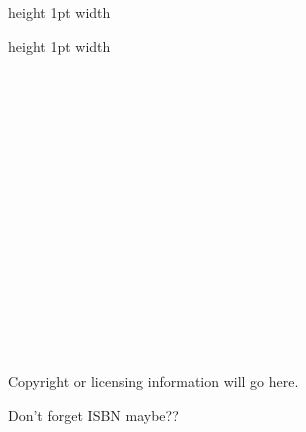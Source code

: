 \maketitle

\newpage
~
\newpage

~\\~\\~\\~\\~\\~\\~\\~\\~\\

\begin{center}
\begin{Large}
	\noindent\vrule height 1pt width \textwidth
	
	\textbf{\thetitle}
	
	\noindent\vrule height 1pt width \textwidth
\end{Large}

\theauthor
\end{center}

\newpage

~\\~\\~\\~\\~\\~\\~\\~\\~\\

\begin{large}
	\textbf{\thetitle}
\end{large}

~\\~\\~\\~\\~\\

\begin{small}
	Copyright or licensing information will go here.
	
	Don't forget ISBN maybe??
\end{small}



\newpage

